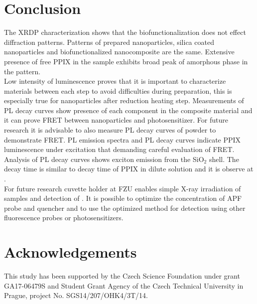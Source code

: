 \newpage

\section{Conclusion}
\label{s:conclusion}


    The XRDP characterization shows that the biofunctionalization does not effect diffraction patterns. Patterns of prepared nanoparticles, silica coated nanoparticles and biofunctionalized nanocomposite are the same. 
    Extensive presence of free PPIX in the sample exhibits broad peak of amorphous phase in the pattern.\\

    Low intensity of luminescence proves that it is important to characterize materials between each step to avoid difficulties during preparation, this is especially true for nanoparticles after reduction heating step. 
    Measurements of PL decay curves show presence of each component in the composite material and it can prove FRET between nanoparticles and photosensitizer. 
    For future research it is advisable to also measure PL decay curves of powder to demonstrate FRET. 
    PL emission spectra and PL decay curves indicate PPIX luminescence under  excitation that demanding careful evaluation of FRET. 
    Analysis of PL decay curves shows exciton emission from the SiO$_{2}$ shell. The decay time is similar to decay time of PPIX in dilute solution and it is observe at .\\

    For future research cuvette holder at FZU enables simple X-ray irradiation of samples and detection of {\singlet}. 
    It is possible to optimize the concentration of APF probe and quencher {\azid} and to use the optimized method for {\singlet} detection using other fluorescence probes or photosensitizers.



\section*{Acknowledgements}
This study has been supported by the Czech Science Foundation under grant GA17-06479S and Student Grant Agency of the Czech Technical University in Prague, project No. SGS14/207/OHK4/3T/14.